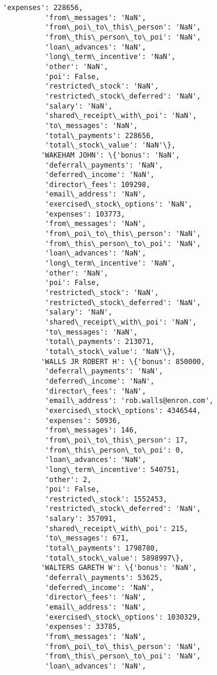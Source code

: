 \documentclass[11pt]{article}
\begin{document}
\begin{Verbatim}[commandchars=\\\{\}]
          'expenses': 228656,
          'from\_messages': 'NaN',
          'from\_poi\_to\_this\_person': 'NaN',
          'from\_this\_person\_to\_poi': 'NaN',
          'loan\_advances': 'NaN',
          'long\_term\_incentive': 'NaN',
          'other': 'NaN',
          'poi': False,
          'restricted\_stock': 'NaN',
          'restricted\_stock\_deferred': 'NaN',
          'salary': 'NaN',
          'shared\_receipt\_with\_poi': 'NaN',
          'to\_messages': 'NaN',
          'total\_payments': 228656,
          'total\_stock\_value': 'NaN'\},
         'WAKEHAM JOHN': \{'bonus': 'NaN',
          'deferral\_payments': 'NaN',
          'deferred\_income': 'NaN',
          'director\_fees': 109298,
          'email\_address': 'NaN',
          'exercised\_stock\_options': 'NaN',
          'expenses': 103773,
          'from\_messages': 'NaN',
          'from\_poi\_to\_this\_person': 'NaN',
          'from\_this\_person\_to\_poi': 'NaN',
          'loan\_advances': 'NaN',
          'long\_term\_incentive': 'NaN',
          'other': 'NaN',
          'poi': False,
          'restricted\_stock': 'NaN',
          'restricted\_stock\_deferred': 'NaN',
          'salary': 'NaN',
          'shared\_receipt\_with\_poi': 'NaN',
          'to\_messages': 'NaN',
          'total\_payments': 213071,
          'total\_stock\_value': 'NaN'\},
         'WALLS JR ROBERT H': \{'bonus': 850000,
          'deferral\_payments': 'NaN',
          'deferred\_income': 'NaN',
          'director\_fees': 'NaN',
          'email\_address': 'rob.walls@enron.com',
          'exercised\_stock\_options': 4346544,
          'expenses': 50936,
          'from\_messages': 146,
          'from\_poi\_to\_this\_person': 17,
          'from\_this\_person\_to\_poi': 0,
          'loan\_advances': 'NaN',
          'long\_term\_incentive': 540751,
          'other': 2,
          'poi': False,
          'restricted\_stock': 1552453,
          'restricted\_stock\_deferred': 'NaN',
          'salary': 357091,
          'shared\_receipt\_with\_poi': 215,
          'to\_messages': 671,
          'total\_payments': 1798780,
          'total\_stock\_value': 5898997\},
         'WALTERS GARETH W': \{'bonus': 'NaN',
          'deferral\_payments': 53625,
          'deferred\_income': 'NaN',
          'director\_fees': 'NaN',
          'email\_address': 'NaN',
          'exercised\_stock\_options': 1030329,
          'expenses': 33785,
          'from\_messages': 'NaN',
          'from\_poi\_to\_this\_person': 'NaN',
          'from\_this\_person\_to\_poi': 'NaN',
          'loan\_advances': 'NaN',

\end{Verbatim}
\end{document}

